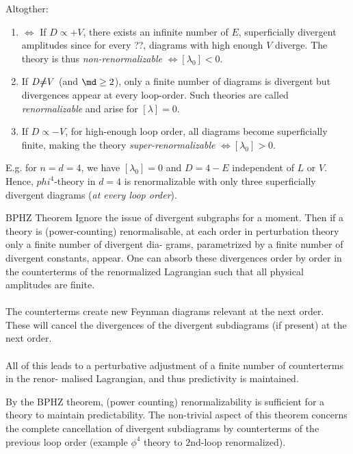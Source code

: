 Altogther:
\begin{enumerate}
	\item $\Leftrightarrow$ If $D\propto + V$, there exists an infinite number of $E$, superficially divergent amplitudes since for every ??, diagrams with high enough $V$ diverge. The theory is thus \emph{non-renormalizable} $\Leftrightarrow [\lambda_0] <0$.
	\item If $D\slashed{\neq} V$ (and $\md \geq 2$), only a finite number of diagrams is divergent but divergences appear at every loop-order. Such theories are called \emph{renormalizable} and arise for $[\lambda]=0$.
	\item If $D \propto -V$, for high-enough loop order, all diagrams become superficially finite, making the theory \emph{super-renormalizable} $\Leftrightarrow [\lambda_0] >0$.
\end{enumerate}
E.g. for $n=d=4$, we have $[\lambda_0 ] =0$ and $D=4-E$ independent of $L$ or $V$. Hence, $phi^4$-theory in $d=4$ is renormalizable with only three superficially divergent diagrams (\emph{at every loop order}).\\
\begin{mybox}{BPHZ Theorem}
	Ignore the issue of divergent subgraphs for a moment. Then if a theory is (power-counting)
	renormalisable, at each order in perturbation theory only a finite number of divergent dia-
	grams, parametrized by a finite number of divergent constants, appear. One can absorb these
	divergences order by order in the counterterms of the renormalized Lagrangian such that all
	physical amplitudes are finite.\\
	\\
	 The counterterms create new Feynman diagrams relevant at the next order. These will cancel
	the divergences of the divergent subdiagrams (if present) at the next order.\\
	\\
	 All of this leads to a perturbative adjustment of a finite number of counterterms in the renor-
	malised Lagrangian, and thus predictivity is maintained.
\end{mybox}
By the BPHZ theorem, (power counting) renormalizability is sufficient for a theory to maintain predictability. The non-trivial aspect of this theorem concerns the complete cancellation of divergent subdiagrams by counterterms of the previous loop order (example $\phi^4$ theory to $2$nd-loop renormalized).









